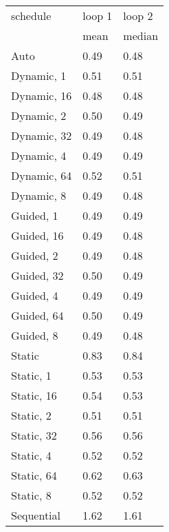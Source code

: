 \begin{tabu}{l|ll}
            schedule &loop 1 &loop 2 \\
                     &mean &median \\            \hline
Auto&0.49 &0.48\\
Dynamic, 1&0.51 &0.51\\
Dynamic, 16&0.48 &0.48\\
Dynamic, 2&0.50 &0.49\\
Dynamic, 32&0.49 &0.48\\
Dynamic, 4&0.49 &0.49\\
Dynamic, 64&0.52 &0.51\\
Dynamic, 8&0.49 &0.48\\
Guided, 1&0.49 &0.49\\
Guided, 16&0.49 &0.48\\
Guided, 2&0.49 &0.48\\
Guided, 32&0.50 &0.49\\
Guided, 4&0.49 &0.49\\
Guided, 64&0.50 &0.49\\
Guided, 8&0.49 &0.48\\
Static&0.83 &0.84\\
Static, 1&0.53 &0.53\\
Static, 16&0.54 &0.53\\
Static, 2&0.51 &0.51\\
Static, 32&0.56 &0.56\\
Static, 4&0.52 &0.52\\
Static, 64&0.62 &0.63\\
Static, 8&0.52 &0.52\\
Sequential&1.62 &1.61\\
\end{tabu}